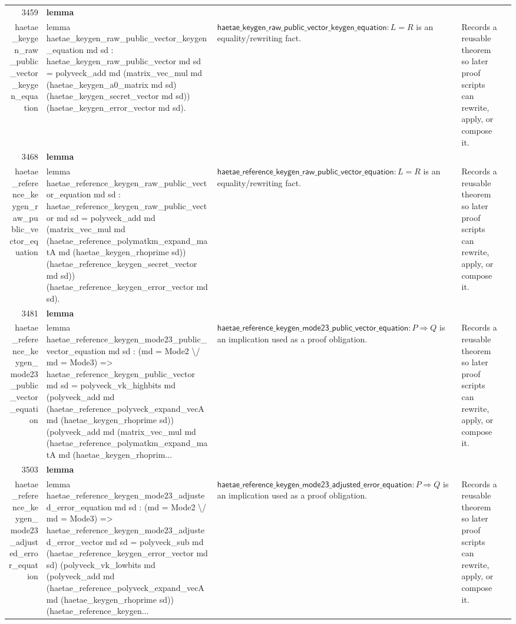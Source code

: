 \documentclass[10pt]{article}
\newcommand{\ec}[1]{\begingroup\ttfamily\scriptsize #1\endgroup}
\begin{document}
\begin{longtable}{r L{0.17\textwidth} L{0.26\textwidth} L{0.27\textwidth} L{0.20\textwidth}}
3459 & \textbf{lemma}\\\ec{haetae\_keygen\_raw\_public\_vector\_keygen\_equation} & \ec{lemma haetae\_keygen\_raw\_public\_vector\_keygen\_equation md sd : haetae\_keygen\_raw\_public\_vector md sd = polyveck\_add md (matrix\_vec\_mul md (haetae\_keygen\_a0\_matrix md sd) (haetae\_keygen\_secret\_vector md sd)) (haetae\_keygen\_error\_vector md sd).} & \(\mathsf{haetae\_keygen\_raw\_public\_vector\_keygen\_equation} : L = R\) is an equality/rewriting fact. & Records a reusable theorem so later proof scripts can rewrite, apply, or compose it. \\
3468 & \textbf{lemma}\\\ec{haetae\_reference\_keygen\_raw\_public\_vector\_equation} & \ec{lemma haetae\_reference\_keygen\_raw\_public\_vector\_equation md sd : haetae\_reference\_keygen\_raw\_public\_vector md sd = polyveck\_add md (matrix\_vec\_mul md (haetae\_reference\_polymatkm\_expand\_matA md (haetae\_keygen\_rhoprime sd)) (haetae\_reference\_keygen\_secret\_vector md sd)) (haetae\_reference\_keygen\_error\_vector md sd).} & \(\mathsf{haetae\_reference\_keygen\_raw\_public\_vector\_equation} : L = R\) is an equality/rewriting fact. & Records a reusable theorem so later proof scripts can rewrite, apply, or compose it. \\
3481 & \textbf{lemma}\\\ec{haetae\_reference\_keygen\_mode23\_public\_vector\_equation} & \ec{lemma haetae\_reference\_keygen\_mode23\_public\_vector\_equation md sd : (md = Mode2 \textbackslash{}/ md = Mode3) => haetae\_reference\_keygen\_public\_vector md sd = polyveck\_vk\_highbits md (polyveck\_add md (haetae\_reference\_polyveck\_expand\_vecA md (haetae\_keygen\_rhoprime sd)) (polyveck\_add md (matrix\_vec\_mul md (haetae\_reference\_polymatkm\_expand\_matA md (haetae\_keygen\_rhoprim...} & \(\mathsf{haetae\_reference\_keygen\_mode23\_public\_vector\_equation} : P \Rightarrow Q\) is an implication used as a proof obligation. & Records a reusable theorem so later proof scripts can rewrite, apply, or compose it. \\
3503 & \textbf{lemma}\\\ec{haetae\_reference\_keygen\_mode23\_adjusted\_error\_equation} & \ec{lemma haetae\_reference\_keygen\_mode23\_adjusted\_error\_equation md sd : (md = Mode2 \textbackslash{}/ md = Mode3) => haetae\_reference\_keygen\_mode23\_adjusted\_error\_vector md sd = polyveck\_sub md (haetae\_reference\_keygen\_error\_vector md sd) (polyveck\_vk\_lowbits md (polyveck\_add md (haetae\_reference\_polyveck\_expand\_vecA md (haetae\_keygen\_rhoprime sd)) (haetae\_reference\_keygen...} & \(\mathsf{haetae\_reference\_keygen\_mode23\_adjusted\_error\_equation} : P \Rightarrow Q\) is an implication used as a proof obligation. & Records a reusable theorem so later proof scripts can rewrite, apply, or compose it. \\

\end{longtable}
\end{document}
